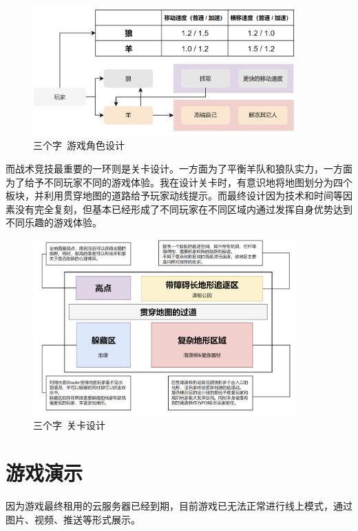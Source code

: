 \begin{figure}[H]
    \centering
    \includegraphics[width=0.9\textwidth]{Images/三个字/sgz_division.png}
    \caption{三个字\ 游戏角色设计}
\end{figure}

而战术竞技最重要的一环则是关卡设计。一方面为了平衡羊队和狼队实力，一方面为了给予不同玩家不同的游戏体验。我在设计关卡时，有意识地将地图划分为四个板块，并利用贯穿地图的道路给予玩家动线提示。而最终设计因为技术和时间等因素没有完全复刻，但基本已经形成了不同玩家在不同区域内通过发挥自身优势达到不同乐趣的游戏体验。

\begin{figure}[H]
    \centering
    \includegraphics[width=0.9\textwidth]{Images/三个字/sgz_level.png}
    \caption{三个字\ 关卡设计}
\end{figure}

\section{游戏演示}
因为游戏最终租用的云服务器已经到期，目前游戏已无法正常进行线上模式，通过图片、视频、推送等形式展示。


